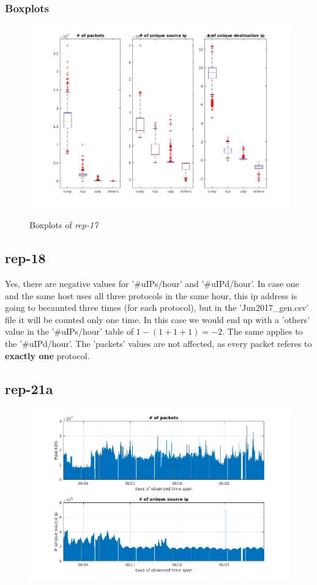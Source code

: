 \subsubsection*{Boxplots}
\begin{figure}[H]
\center
\includegraphics[width=.7\textwidth]{./chapters/plots/rep17.jpg}\\
\caption{Boxplots of \textit{rep-17}}
\end{figure}
\subsection*{rep-18}
Yes, there are negative values for '\#uIPs/hour' and '\#uIPd/hour'. In case one and the same host uses all three protocols in the same hour, this ip address is going to becaunted three times (for each protocol), but in the 'Jun2017\_gen.csv' file it will be counted only one time. In this case we would end up with a 'others' value in the '\#uIPs/hour' table of $1 - (1+1+1) = -2$. The same applies to the '\#uIPd/hour'. The 'packets' values are not affected, as every packet referes to \textbf{exactly one} protocol.

\subsection*{rep-21a}
\begin{figure}[H]
\center
\includegraphics[width=.7\textwidth]{./chapters/plots/rep21a.jpg}\\
\caption{}
\end{figure}

